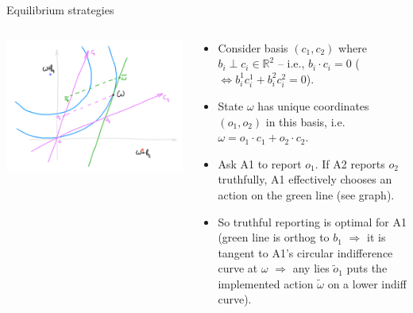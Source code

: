 \documentclass[english,10pt
,aspectratio=169
]{beamer}
\begin{document}
\begin{frame}{Equilibrium strategies}
\begin{columns}
	\begin{column}{0.5\textwidth}
		\begin{center}
			\includegraphics[scale=0.65]{pics/M4/battaglini04.png}
		\end{center}
	\end{column}
	\begin{column}{0.5\textwidth}
		{\small
			\begin{itemize}
				\item Consider basis $(c_1,c_2)$ where $b_i \perp c_i \in \mathbb{R}^2$ -- i.e., $b_i \cdot c_i = 0$ ($\iff b_i^1 c_i^1 + b_i^2 c_i^2 = 0$). 
				\item State $\omega$ has unique coordinates $(o_1,o_2)$ in this basis, i.e. $\omega = o_1 \cdot c_1 + o_2 \cdot c_2$.
				\item Ask A1 to report $o_1$. If A2 reports $o_2$ truthfully, A1 effectively chooses an action on the green line (see graph). 
				\item So truthful reporting is optimal for A1 (green line is orthog to $b_1$ $\Rightarrow$ it is tangent to A1's circular indifference curve at $\omega$ $\Rightarrow$ any lies $\tilde{o}_1$ puts the implemented action $\tilde{\omega}$ on a lower indiff curve).
			\end{itemize}
		}
	\end{column}
\end{columns}
\end{frame}
\end{document}
